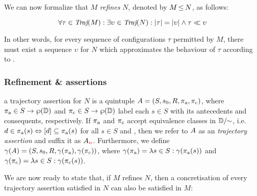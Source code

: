 

We can now formalize that $M$ \textit{refines} $N$, denoted by $M \operatorname{\leq} N$, as follows:

\begin{equation*}
\forall \tau \in \operatorname{\textit{Traj}}(M) : \exists \upsilon \in \operatorname{\textit{Traj}}(N) : | \tau | = | \upsilon | \wedge \tau \ll \upsilon
\end{equation*}

\noindent In other words, for every sequence of configurations $\tau$ permitted by $M$, there must exist a sequence $\upsilon$ for $N$ which approximates the behaviour of $\tau$ according to . 

\subsubsection{Refinement \& assertions}

 a trajectory assertion for $N$ is a quintuple $A = (S, s_{0}, R, \operatorname{\pi_{\textrm{a}}}, \operatorname{\pi_{\textrm{c}}})$, where $\operatorname{\pi_{\textrm{a}}} \in S \rightarrow \wp(\mathbb{D})$ and $\operatorname{\pi_{\textrm{c}}} \in S \rightarrow \wp(\mathbb{D})$ label each $s \in S$ with its antecedents and consequents, respectively. If $\operatorname{\pi_{\textrm{a}}}$ and $\operatorname{\pi_{\textrm{c}}}$ accept equivalence classes in $\mathbb{D} / \mkern-6mu\sim$, i.e. $d \in \operatorname{\pi_{\textrm{a}}}(s) \Leftrightarrow [d] \subseteq \operatorname{\pi_{\textrm{a}}}(s)$ for all $s \in S$ and , then we refer to $A$ as an \textit{ trajectory assertion} and suffix it as $A_{\textcolor{red}{n}}$. Furthermore, we define $\gamma(A) = (S, s_{0}, R, \gamma(\operatorname{\pi_{\textrm{a}}}), \gamma(\operatorname{\pi_{\textrm{c}}}))$, where $\gamma(\operatorname{\pi_{\textrm{a}}}) = \lambda s \in S : \gamma(\operatorname{\pi_{\textrm{a}}}(s))$ and $\gamma(\operatorname{\pi_{\textrm{c}}}) = \lambda s \in S : \gamma(\operatorname{\pi_{\textrm{c}}}(s))$.



We are now ready to state that, if $M$ refines $N$, then a concretisation of every  trajectory assertion satisfied in $N$ can also be satisfied in $M$:

